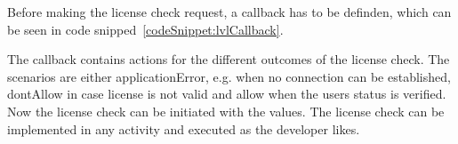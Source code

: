 Before making the license check request, a callback has to be definden, which can be seen in code snipped~\ref{codeSnippet:lvlCallback}.

The callback contains actions for the different outcomes of the license check.
The scenarios are either applicationError, e.g. when no connection can be established, dontAllow in case license is not valid and allow when the users status is verified.
Now the license check can be initiated with the values. \cite{developersLicensingSetup}\cite{developersLicensingAdding}
\newline
The license check can be implemented in any activity and executed as the developer likes.
